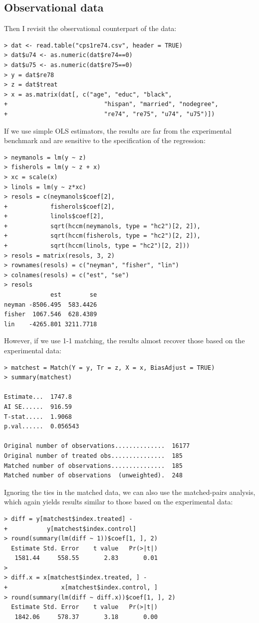 \subsection{Observational data}
Then I revisit the observational counterpart of the data:
\begin{lstlisting}
> dat <- read.table("cps1re74.csv", header = TRUE)
> dat$u74 <- as.numeric(dat$re74==0)
> dat$u75 <- as.numeric(dat$re75==0)
> y = dat$re78
> z = dat$treat
> x = as.matrix(dat[, c("age", "educ", "black",
+                           "hispan", "married", "nodegree",
+                           "re74", "re75", "u74", "u75")])
 \end{lstlisting} 
If we use simple OLS estimators, the results are far from the experimental benchmark and are sensitive to the specification of the regression:
\begin{lstlisting}
> neymanols = lm(y ~ z)
> fisherols = lm(y ~ z + x)
> xc = scale(x)
> linols = lm(y ~ z*xc)
> resols = c(neymanols$coef[2],
+            fisherols$coef[2],
+            linols$coef[2],
+            sqrt(hccm(neymanols, type = "hc2")[2, 2]),
+            sqrt(hccm(fisherols, type = "hc2")[2, 2]),
+            sqrt(hccm(linols, type = "hc2")[2, 2]))
> resols = matrix(resols, 3, 2)
> rownames(resols) = c("neyman", "fisher", "lin")
> colnames(resols) = c("est", "se")
> resols 
             est        se
neyman -8506.495  583.4426
fisher  1067.546  628.4389
lin    -4265.801 3211.7718
  \end{lstlisting} 
  However, if we use 1-1 matching, the results almost recover those based on the experimental data:
  \begin{lstlisting}
> matchest = Match(Y = y, Tr = z, X = x, BiasAdjust = TRUE)
> summary(matchest)

Estimate...  1747.8 
AI SE......  916.59 
T-stat.....  1.9068 
p.val......  0.056543 

Original number of observations..............  16177 
Original number of treated obs...............  185 
Matched number of observations...............  185 
Matched number of observations  (unweighted).  248
   \end{lstlisting} 
   
Ignoring the ties in the matched data, we can also use the matched-pairs analysis, which again yields results similar to those based    on the experimental data:
  \begin{lstlisting}
> diff = y[matchest$index.treated] - 
+           y[matchest$index.control]
> round(summary(lm(diff ~ 1))$coef[1, ], 2)
  Estimate Std. Error    t value   Pr(>|t|) 
   1581.44     558.55       2.83       0.01 
> 
> diff.x = x[matchest$index.treated, ] - 
+               x[matchest$index.control, ]
> round(summary(lm(diff ~ diff.x))$coef[1, ], 2)
  Estimate Std. Error    t value   Pr(>|t|) 
   1842.06     578.37       3.18       0.00 
   \end{lstlisting} 
   
